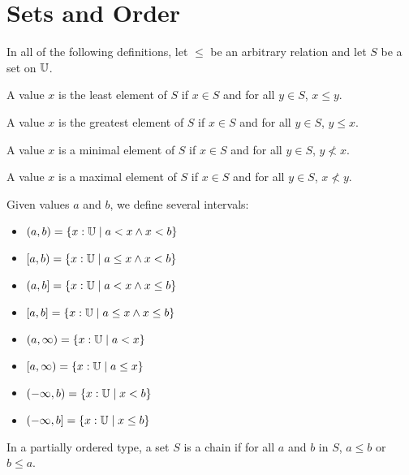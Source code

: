 \documentclass[../math.tex]{subfiles}
\begin{document}
\section{Sets and Order}

In all of the following definitions, let $\leq$ be an arbitrary relation and let
$S$ be a set on $\mathbb{U}$.

\begin{definition}
    A value $x$ is the least element of $S$ if $x \in S$ and for all $y \in S$,
    $x \leq y$.
\end{definition}

\begin{definition}
    A value $x$ is the greatest element of $S$ if $x \in S$ and for all $y \in
    S$, $y \leq x$.
\end{definition}

\begin{definition}
    A value $x$ is a minimal element of $S$ if $x \in S$ and for all $y \in S$,
    $y \nless x$.
\end{definition}

\begin{definition}
    A value $x$ is a maximal element of $S$ if $x \in S$ and for all $y \in S$,
    $x \nless y$.
\end{definition}

\begin{definition}
    Given values $a$ and $b$, we define several intervals:
    \begin{itemize}
        \item $(a, b) = \{x : \mathbb{U} \mid a < x \wedge x < b\}$
        \item $[a, b) = \{x : \mathbb{U} \mid a \leq x \wedge x < b\}$
        \item $(a, b] = \{x : \mathbb{U} \mid a < x \wedge x \leq b\}$
        \item $[a, b] = \{x : \mathbb{U} \mid a \leq x \wedge x \leq b\}$
        \item $(a, \infty) = \{x : \mathbb{U} \mid a < x\}$
        \item $[a, \infty) = \{x : \mathbb{U} \mid a \leq x\}$
        \item $(-\infty, b) = \{x : \mathbb{U} \mid x < b\}$
        \item $(-\infty, b] = \{x : \mathbb{U} \mid x \leq b\}$
    \end{itemize}
\end{definition}

\begin{definition}
    In a partially ordered type, a set $S$ is a chain if for all $a$ and $b$ in
    $S$, $a \leq b$ or $b \leq a$.
\end{definition}
\end{document}
